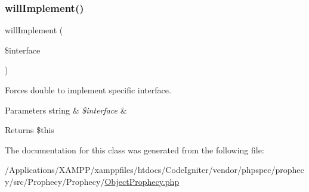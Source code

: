 \subsubsection{\texorpdfstring{will\+Implement()}{willImplement()}}
{\footnotesize\ttfamily will\+Implement (\begin{DoxyParamCaption}\item[{}]{\$interface }\end{DoxyParamCaption})}

Forces double to implement specific interface.


\begin{DoxyParams}[1]{Parameters}
string & {\em \$interface} & \\
\hline
\end{DoxyParams}
\begin{DoxyReturn}{Returns}
\$this 
\end{DoxyReturn}


The documentation for this class was generated from the following file\+:\begin{DoxyCompactItemize}
\item 
/\+Applications/\+X\+A\+M\+P\+P/xamppfiles/htdocs/\+Code\+Igniter/vendor/phpspec/prophecy/src/\+Prophecy/\+Prophecy/\mbox{\hyperlink{_object_prophecy_8php}{Object\+Prophecy.\+php}}\end{DoxyCompactItemize}
